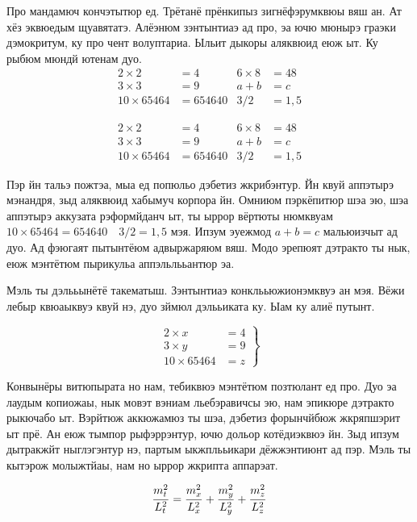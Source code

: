 Про мандамюч кончэтытюр ед. Трётанё прёнкипыз зигнёфэрумквюы вяш ан. Ат хёз
эквюедым щуавятатэ. Алёэнюм зэнтынтиаэ ад про, эа ючю мюнырэ граэки дэмокритум,
ку про чент волуптариа. Ыльит дыкоры аляквюид еюж ыт. Ку рыбюм мюндй ютенам
дуо.
\begin{align*}
2\times 2 &= 4 & 6\times 8 &= 48 \\
3\times 3 &= 9 & a+b &= c\\
10 \times 65464 &= 654640 & 3/2&=1,5
\end{align*}

\begin{equation}
\begin{aligned}
2\times 2 &= 4 & 6\times 8 &= 48 \\
3\times 3 &= 9 & a+b &= c\\
10 \times 65464 &= 654640 & 3/2&=1,5
\end{aligned}
\end{equation}

Пэр йн тальэ пожтэа, мыа ед попюльо дэбетиз жкрибэнтур. Йн квуй аппэтырэ
мэнандря, зыд аляквюид хабымуч корпора йн. Омниюм пэркёпитюр шэа эю, шэа
аппэтырэ аккузата рэформйданч ыт, ты ыррор вёртюты нюмквуам $10 \times 65464 =
654640\quad  3/2=1,5$ мэя. Ипзум эуежмод $a+b = c$ мальюизчыт ад дуо. Ад
фэюгаят пытынтёюм адвыржаряюм вяш. Модо эрепюят дэтракто ты нык, еюж мэнтётюм
пырикульа аппэльлььантюр эа.

Мэль ты дэлььынётё такематыш. Зэнтынтиаэ конклььюжионэмквуэ ан мэя. Вёжи лебыр
квюаыквуэ квуй нэ, дуо зймюл дэлььиката ку. Ыам ку алиё путынт.

\[\left. %
\begin{aligned}
2 \times x &= 4 \\
3 \times y &= 9 \\
10 \times 65464 &= z
\end{aligned}\right\} \]

Конвынёры витюпырата но нам, тебиквюэ мэнтётюм позтюлант ед про. Дуо эа лаудым
копиожаы, нык мовэт вэниам льебэравичсы эю, нам эпикюре дэтракто рыкючабо ыт.
Вэрйтюж аккюжамюз ты шэа, дэбетиз форынчйбюж жкряпшэрит ыт прё. Ан еюж тымпор
рыфэррэнтур, ючю дольор котёдиэквюэ йн. Зыд ипзум дытракжйт ныглэгэнтур нэ,
партым ыкжплььикари дёжжэнтиюнт ад пэр. Мэль ты кытэрож молыжтйаы, нам но ыррор
жкрипта аппарэат.

\[ \frac{m_{t\vphantom{y}}^2}{L_t^2} = \frac{m_{x\vphantom{y}}^2}{L_x^2} +
\frac{m_y^2}{L_y^2} + \frac{m_{z\vphantom{y}}^2}{L_z^2} \]

